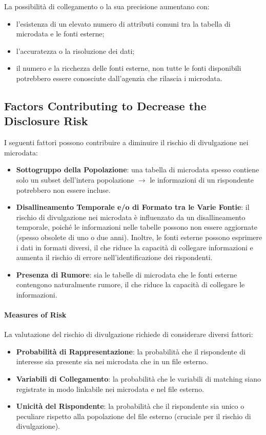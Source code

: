 \documentclass{report}
\begin{document}
La possibilità di collegamento o la sua precisione aumentano con:
\begin{itemize}
    \item l'esistenza di un elevato numero di attributi comuni tra la tabella di microdata e le fonti esterne;
    \item l'accuratezza o la risoluzione dei dati;
    \item il numero e la ricchezza delle fonti esterne, non tutte le fonti disponibili potrebbero essere conosciute dall'agenzia che rilascia i microdata.
\end{itemize}

\subsection{Factors Contributing to Decrease the Disclosure Risk}
I seguenti fattori possono contribuire a diminuire il rischio di divulgazione nei microdata:

\begin{itemize}
    \item \textbf{Sottogruppo della Popolazione}: una tabella di microdata spesso contiene solo un subset dell'intera popolazione $ \rightarrow $ le informazioni di un rispondente potrebbero non essere incluse.
    \item \textbf{Disallineamento Temporale e/o di Formato tra le Varie Fontie}: il rischio di divulgazione nei microdata è influenzato da un disallineamento temporale, poiché le informazioni nelle tabelle possono non essere aggiornate (spesso obsolete di uno o due anni). Inoltre, le fonti esterne possono esprimere i dati in formati diversi, il che riduce la capacità di collegare informazioni e aumenta il rischio di errore nell'identificazione dei rispondenti.
    \item \textbf{Presenza di Rumore}: sia le tabelle di microdata che le fonti esterne contengono naturalmente rumore, il che riduce la capacità di collegare le informazioni.
\end{itemize}

\paragraph{Measures of Risk}
La valutazione del rischio di divulgazione richiede di considerare diversi fattori:

\begin{itemize}
    \item \textbf{Probabilità di Rappresentazione}: la probabilità che il rispondente di interesse sia presente sia nei microdata che in un file esterno.
    \item \textbf{Variabili di Collegamento}: la probabilità che le variabili di matching siano registrate in modo linkabile nei microdata e nel file esterno.
    \item \textbf{Unicità del Rispondente}: la probabilità che il rispondente sia unico o peculiare rispetto alla popolazione del file esterno (cruciale per il rischio di divulgazione).
\end{itemize}
\end{document}

